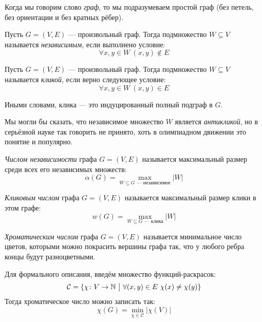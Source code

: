 \begin{note}
	Когда мы говорим слово \textit{граф}, то мы подразумеваем простой граф (без петель, без ориентации и без кратных рёбер).
\end{note}

\begin{reminder}
	Пусть $G = (V, E)$ --- произвольный граф. Тогда подмножество $W \subseteq V$ называется \textit{независимым}, если выполнено условие:
	\[
		\forall x, y \in W\ (x, y) \notin E
	\]
\end{reminder}

\begin{definition}
	Пусть $G = (V, E)$ --- произвольный граф. Тогда подмножество $W \subseteq V$ называется \textit{кликой}, если верно следующее условие:
	\[
		\forall x, y \in W\ (x, y) \in E
	\]
\end{definition}

\begin{note}
	Иными словами, клика --- это индуцированный полный подграф в $G$.
\end{note}

\begin{note}
	Мы могли бы сказать, что независимое множество $W$ является \textit{антикликой}, но в серьёзной науке так говорить не принято, хоть в олимпиадном движении это понятие и популярно.
\end{note}

\begin{reminder}
	\textit{Числом независимости} графа $G = (V, E)$ называется максимальный размер среди всех его независимых множеств:
	\[
		\alpha(G) = \max_{W \subseteq G \text{ --- независимое}} |W|
	\]
\end{reminder}

\begin{definition}
	\textit{Кликовым числом} графа $G = (V, E)$ называется максимальный размер клики в этом графе:
	\[
		w(G) = \max_{W \subseteq G \text{ --- клика}} |W|
	\]
\end{definition}

\begin{definition}
	\textit{Хроматическим числом} графа $G = (V, E)$ называется минимальное число цветов, которыми можно покрасить вершины графа так, что у любого ребра концы будут разноцветными.
	
	Для формального описания, введём множество функций-раскрасок:
	\[
		\mathcal{C} = \{\chi \colon V \to \mathbb{N} \ \big|\  \forall (x, y) \in E\ \chi(x) \neq \chi(y)\}
	\]
	Тогда хроматическое число можно записать так:
	\[
		\chi(G) = \min_{\chi \in \mathcal{C}} |\chi(V)|
	\]
\end{definition}

